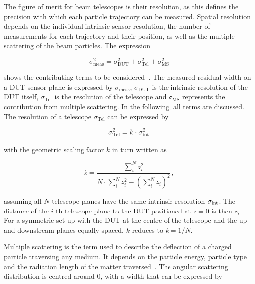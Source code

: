 The figure of merit for beam telescopes is their resolution, as this defines the precision with which each particle trajectory can be measured. 
Spatial resolution depends on the individual intrinsic sensor resolution, the number of measurements for each trajectory and their position, as well as the multiple scattering of the beam particles.
The expression

\begin{equation}
\label{eq:telescoperesolutionequation}
\sigma_{\textrm{meas}}^2 = \sigma_{\textrm{DUT}}^2 + \sigma_{\textrm{Tel}}^2 +
\sigma_{\textrm{MS}}^2
\end{equation}

\noindent shows the contributing terms to be considered~\cite{ref:eudetreport200902}. 
The measured residual width on a DUT sensor plane is expressed by $\sigma_{\textrm{meas}}$, $\sigma_{\textrm{DUT}}$ is the intrinsic resolution of the DUT itself,
 $\sigma_{\textrm{Tel}}$ is the resolution of the telescope and $\sigma_{\textrm{MS}}$ represents the contribution from multiple scattering.
In the following, all terms are discussed.
The resolution of a telescope $\sigma_{\textrm{Tel}}$ can be expressed by

\begin{equation}
\label{eq:telescopepointing}
\sigma_{\textrm{Tel}}^2 = k \cdot \sigma_{\textrm{int}}^2
\end{equation}

\noindent with the geometric scaling factor $k$ in turn written as

\begin{equation}
k = \frac{\sum_i^N z_i^2}{N \cdot \sum_i^N z_i^2 - \left( \sum_i^N z_i \right)^2} \,,
\end{equation}

\noindent assuming all $N$ telescope planes have the same intrinsic resolution $\sigma_{\textrm{int}}$. 
The distance of the $i$-th telescope plane to the DUT positioned at $z=0$ is then $z_i$ .
For a symmetric set-up with the DUT at the centre of the telescope and the up- and downstream planes equally spaced, $k$ reduces to $k = 1/N$. 

Multiple scattering is the term used to describe the deflection of a charged particle traversing any medium.
It depends on the particle energy, particle type and the radiation length of the matter traversed~\cite{ref:scatteringhighland}.
The angular scattering distribution is centred around $0$, with a width that can be expressed by~\cite{ref:PDG-2014}

